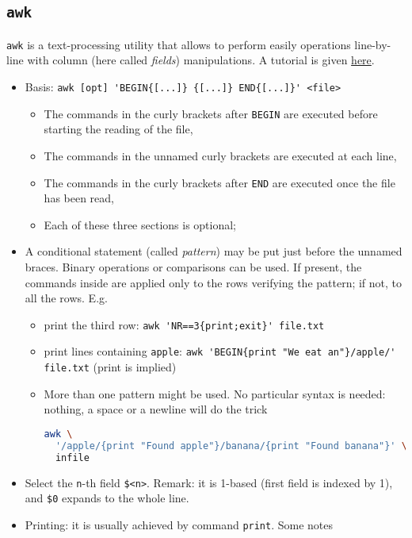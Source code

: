 \documentclass[a4paper,12pt,%
              final%
              ]{article}
\begin{document}
\subsection{\texttt{awk}}
\label{ssec:awk}
\texttt{awk} is a text-processing utility that allows to perform easily operations line-by-line with column (here called \emph{fields}) manipulations. A tutorial is given \href{https://www.tutorialspoint.com/awk/index.htm}{here}.
\begin{itemize}
  \item Basis: \verb|awk [opt] 'BEGIN{[...]} {[...]} END{[...]}' <file>|
    \begin{itemize}
      \item The commands in the curly brackets after \texttt{BEGIN} are executed before starting the reading of the file,
      \item The commands in the unnamed curly brackets are executed at each line,
      \item The commands in the curly brackets after \texttt{END} are executed once the file has been read,
      \item Each of these three sections is optional;
    \end{itemize}
  \item A conditional statement (called \emph{pattern}) may be put just before the unnamed braces. Binary operations or comparisons can be used. If present, the commands inside are applied only to the rows verifying the pattern; if not, to all the rows. E.g.
    \begin{itemize}
      \item print the third row: \verb|awk 'NR==3{print;exit}' file.txt|
      \item print lines containing \texttt{apple}: \verb|awk 'BEGIN{print "We eat an"}/apple/' file.txt| (print is implied)
      \item More than one pattern might be used. No particular syntax is needed: nothing, a space or a newline will do the trick
\begin{lstlisting}[language=bash]
awk \
  '/apple/{print "Found apple"}/banana/{print "Found banana"}' \
  infile
\end{lstlisting}
    \end{itemize}
  \item Select the \texttt{n}-th field \verb|$<n>|. Remark: it is 1-based (first field is indexed by 1), and \verb|$0| expands to the whole line.
  \item Printing: it is usually achieved by command \texttt{print}. Some notes

\end{itemize}
\end{document}
